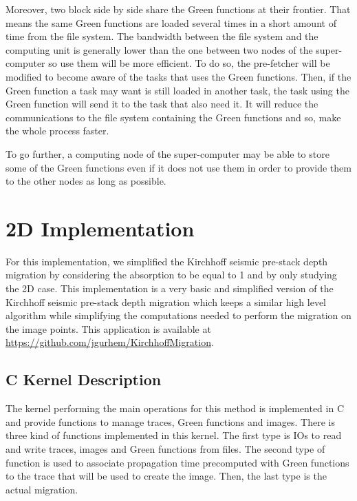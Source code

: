 Moreover, two block side by side share the Green functions at their frontier.
That means the same Green functions are loaded several times in a short amount of time from the file system.
The bandwidth between the file system and the computing unit is generally lower than the one between two nodes of the super-computer so use them will be more efficient.
To do so, the pre-fetcher will be modified to become aware of the tasks that uses the Green functions.
Then, if the Green function a task may want is still loaded in another task, the task using the Green function will send it to the task that also need it.
It will reduce the communications to the file system containing the Green functions and so, make the whole process faster.

To go further, a computing node of the super-computer may be able to store some of the Green functions even if it does not use them in order to provide them to the other nodes as long as possible.

\section{2D Implementation}

For this implementation, we simplified the Kirchhoff seismic pre-stack depth migration by considering the absorption to be equal to 1 and by only studying the 2D case.
This implementation is a very basic and simplified version of the Kirchhoff seismic pre-stack depth migration which keeps a similar high level algorithm while simplifying the computations needed to perform the migration on the image points.
This application is available at \url{https://github.com/jgurhem/KirchhoffMigration}.

\subsection{C Kernel Description}
The kernel performing the main operations for this method is implemented in C and provide functions to manage traces, Green functions and images.
There is three kind of functions implemented in this kernel.
The first type is IOs to read and write traces, images and Green functions from files.
The second type of function is used to associate propagation time precomputed with Green functions to the trace that will be used to create the image.
Then, the last type is the actual migration.

